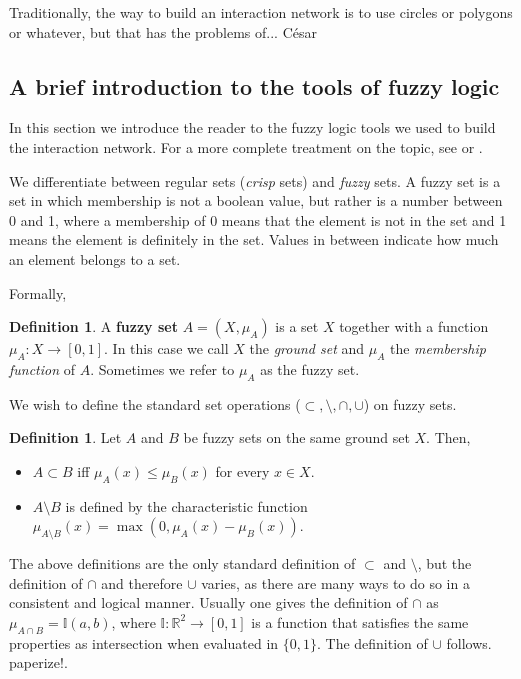 \documentclass[12pt]{article}
\numberwithin{equation}{section} %
\numberwithin{figure}{section} %
\def\RR{{\mathbb{R}}}
\def\II{{\mathbb{I}}}
\theoremstyle{definition}
\newtheorem{definition}[theorem]{Definition}
\def\tcr#1{\textcolor{MyRed}{#1}}
\begin{document}
Traditionally, the way to build an interaction network is to use circles or polygons or whatever, but that has the problems of... \tcr{César}

\subsection{A brief introduction to the tools of fuzzy logic}
In this section we introduce the reader to the fuzzy logic tools we used to build the interaction network. For a more complete treatment on the topic, see \cite{FuzzyLogicSuperBook} or \cite{FuzzyLogicSuperBook2}. 

We differentiate between regular sets (\emph{crisp} sets)  and \emph{fuzzy} sets. A fuzzy set is a set in which membership is not a boolean value, but rather is a number between 0 and 1, where a membership of 0 means that the element is not in the set and 1 means the element is definitely in the set. Values in between indicate how much an element belongs to a set.

Formally,
\begin{definition}
	A \textbf{fuzzy set} $A=(X,\mu_A)$ is a set $X$ together with a function $\mu_A:X \to [0,1]$. In this case we call $X$ the \emph{ground set} and $\mu_A$ the \emph{membership function} of $A$. Sometimes we refer to $\mu_A$ as the fuzzy set.
\end{definition}

We wish to define the standard set operations ($\subset,\setminus,\cap,\cup$) on fuzzy sets. 

\begin{definition}
	Let $A$ and $B$ be fuzzy sets on the same ground set $X$. Then,
	\begin{itemize}
		\item $A \subset B$ iff $\mu_A(x) \leq \mu_B(x)$ for every $x\in X$.
		\item $A\setminus B$ is defined by the characteristic function $\mu_{A\setminus B}(x) = \max(0,\mu_A(x)-\mu_B(x))$.
	\end{itemize}
\end{definition}

The above definitions are the only standard definition of $\subset$ and $\setminus$, but the definition of $\cap$ and therefore $\cup$ varies, as there are many ways to do so in a consistent and logical manner. Usually one gives the definition of $\cap$ as $\mu_{A\cap B} = \II(a,b)$, where  $\II : \RR^2 \to [0,1]$ is a function that satisfies the same properties as intersection when evaluated in $\{0,1\}$. The definition of $\cup$ follows. \tcr{paperize!}. 
\end{document}
